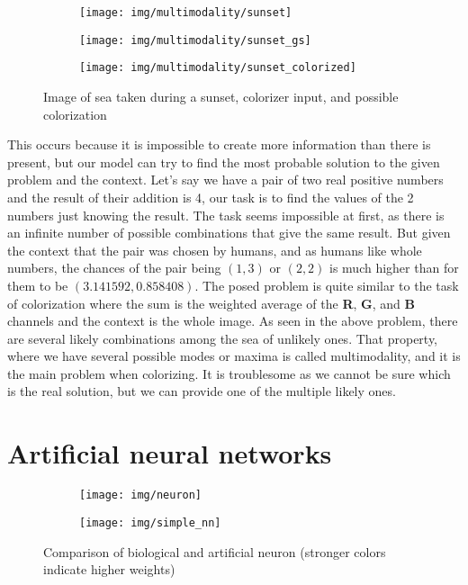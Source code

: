 \begin{figure}
	\centering
	\begin{subfigure}{.32\textwidth}
		\centering
		\texttt{[image: img/multimodality/sunset]}
	\end{subfigure}
	\begin{subfigure}{.32\textwidth}
		\centering
		\texttt{[image: img/multimodality/sunset\_gs]}
	\end{subfigure}
    \begin{subfigure}{.32\textwidth}
		\centering
		\texttt{[image: img/multimodality/sunset\_colorized]}
	\end{subfigure}
    \caption{Image of sea taken during a sunset, colorizer input, and possible colorization}
	\label{fig:multimodality_sunset}
\end{figure}

This occurs because it is impossible to create more information than there is present, 
but our model can try to find the most probable solution to the given problem and the context. 
Let's say we have a pair of two real positive numbers and the result of their 
addition is 4, our task is to find the values of the 2 numbers just knowing the 
result. The task seems impossible at first, as there is an infinite number of possible 
combinations that give the same result. But given the context that the pair was 
chosen by humans, and as humans like whole numbers, the chances of the pair being
$(1, 3)$ or $(2, 2)$ is much higher than for them to be $(3.141592, 0.858408)$. The posed
problem is quite similar to the task of colorization where the sum is the weighted 
average of the \textbf{R}, \textbf{G}, and \textbf{B} channels and the context is the 
whole image. As seen in the above problem, there are several likely combinations
among the sea of unlikely ones. That property, where we have several possible modes 
or maxima is called multimodality, and it is the main problem when colorizing. It is
troublesome as we cannot be sure which is the real solution, but we can provide one 
of the multiple likely ones.

\section{Artificial neural networks}

\begin{figure}
	\centering
	\begin{subfigure}{.49\textwidth}
		\centering
		\texttt{[image: img/neuron]}
	\end{subfigure}
	\begin{subfigure}{.49\textwidth}
		\centering
		\texttt{[image: img/simple\_nn]}
	\end{subfigure}
    \caption{Comparison of biological and artificial neuron (stronger colors indicate higher weights)}
	\label{fig:neuron}
\end{figure}

